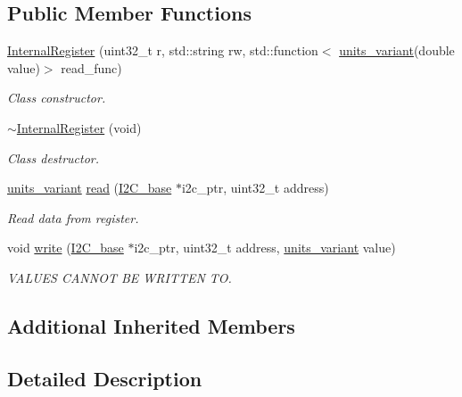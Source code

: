 \subsection*{Public Member Functions}
\begin{DoxyCompactItemize}
\item 
\hyperlink{class_internal_register_a09cee9a73ce992860d9ea3353c9e9e9c}{Internal\+Register} (uint32\+\_\+t r, std\+::string rw, std\+::function$<$ \hyperlink{units__define_8hpp_a95d46867fa79633565c288a0b4bd5408}{units\+\_\+variant}(double value)$>$ read\+\_\+func)
\begin{DoxyCompactList}\small\item\em Class constructor. \end{DoxyCompactList}\item 
\hyperlink{class_internal_register_adee7135b7fb2f55576b07c6440c1a2d9}{$\sim$\+Internal\+Register} (void)
\begin{DoxyCompactList}\small\item\em Class destructor. \end{DoxyCompactList}\item 
\hyperlink{units__define_8hpp_a95d46867fa79633565c288a0b4bd5408}{units\+\_\+variant} \hyperlink{class_internal_register_a7675a310cdb4866c256fef77d388b424}{read} (\hyperlink{class_i2_c__base}{I2\+C\+\_\+base} $\ast$i2c\+\_\+ptr, uint32\+\_\+t address)
\begin{DoxyCompactList}\small\item\em Read data from register. \end{DoxyCompactList}\item 
void \hyperlink{class_internal_register_a8c1844d644fc81a118a6094f3a88feb8}{write} (\hyperlink{class_i2_c__base}{I2\+C\+\_\+base} $\ast$i2c\+\_\+ptr, uint32\+\_\+t address, \hyperlink{units__define_8hpp_a95d46867fa79633565c288a0b4bd5408}{units\+\_\+variant} value)
\begin{DoxyCompactList}\small\item\em V\+A\+L\+U\+ES C\+A\+N\+N\+OT BE W\+R\+I\+T\+T\+EN TO. \end{DoxyCompactList}\end{DoxyCompactItemize}
\subsection*{Additional Inherited Members}


\subsection{Detailed Description}



